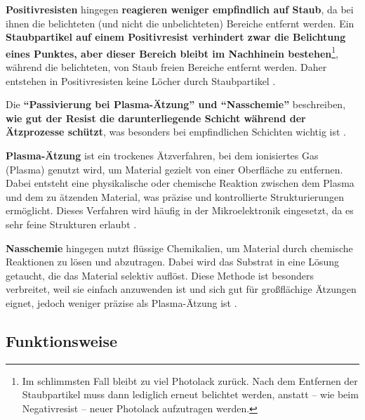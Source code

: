 \documentclass{article} %
\begin{document}
\textbf{Positivresisten} hingegen \textbf{reagieren weniger empfindlich auf Staub}, da bei ihnen die belichteten (und nicht die unbelichteten) Bereiche entfernt werden. Ein \textbf{Staubpartikel auf einem Positivresist verhindert zwar die Belichtung eines Punktes, aber dieser Bereich bleibt im Nachhinein bestehen}\footnote{Im schlimmsten Fall bleibt zu viel Photolack zurück. Nach dem Entfernen der Staubpartikel muss dann lediglich erneut belichtet werden, anstatt -- wie beim Negativresist -- neuer Photolack aufzutragen werden.}, während die belichteten, von Staub freien Bereiche entfernt werden. Daher entstehen in Positivresisten keine Löcher durch Staubpartikel \cite{wias_photoresist}.

\vspace{1em}

Die \textbf{``Passivierung bei Plasma-Ätzung'' und ``Nasschemie''} beschreiben, \textbf{wie gut der Resist die darunterliegende Schicht während der Ätzprozesse schützt}, was besonders bei empfindlichen Schichten wichtig ist \cite{schmid2024}. 

\vspace{1em}

\textbf{Plasma-Ätzung} ist ein trockenes Ätzverfahren, bei dem ionisiertes Gas (Plasma) genutzt wird, um Material gezielt von einer Oberfläche zu entfernen. Dabei entsteht eine physikalische oder chemische Reaktion zwischen dem Plasma und dem zu ätzenden Material, was präzise und kontrollierte Strukturierungen ermöglicht. Dieses Verfahren wird häufig in der Mikroelektronik eingesetzt, da es sehr feine Strukturen erlaubt \cite{madou2002, wolf2000}.

\vspace{1em}

\textbf{Nasschemie} hingegen nutzt flüssige Chemikalien, um Material durch chemische Reaktionen zu lösen und abzutragen. Dabei wird das Substrat in eine Lösung getaucht, die das Material selektiv auflöst. Diese Methode ist besonders verbreitet, weil sie einfach anzuwenden ist und sich gut für großflächige Ätzungen eignet, jedoch weniger präzise als Plasma-Ätzung ist \cite{rogers2008, gerald2006}.





\vspace{1em}

\subsection{Funktionsweise}
\end{document}
